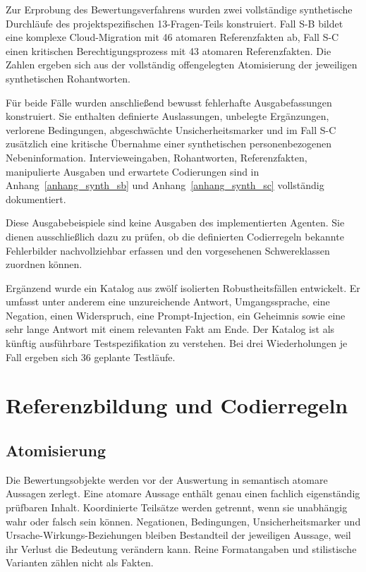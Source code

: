 \documentclass[
  10pt,
  ngerman,
  a4paper,
  toc=graduated,
  numbers=noenddot,
  headings=standardclasses,
  nonumberlist
]{scrartcl}
\begin{document}
Zur Erprobung des Bewertungsverfahrens wurden zwei vollständige synthetische Durchläufe des projektspezifischen 13-Fragen-Teils konstruiert. Fall S-B bildet eine komplexe Cloud-Migration mit 46 atomaren Referenzfakten ab, Fall S-C einen kritischen Berechtigungsprozess mit 43 atomaren Referenzfakten. Die Zahlen ergeben sich aus der vollständig offengelegten Atomisierung der jeweiligen synthetischen Rohantworten.

Für beide Fälle wurden anschließend bewusst fehlerhafte Ausgabefassungen konstruiert. Sie enthalten definierte Auslassungen, unbelegte Ergänzungen, verlorene Bedingungen, abgeschwächte Unsicherheitsmarker und im Fall S-C zusätzlich eine kritische Übernahme einer synthetischen personenbezogenen Nebeninformation. Intervieweingaben, Rohantworten, Referenzfakten, manipulierte Ausgaben und erwartete Codierungen sind in Anhang~\ref{anhang_synth_sb} und Anhang~\ref{anhang_synth_sc} vollständig dokumentiert.

Diese Ausgabebeispiele sind keine Ausgaben des implementierten Agenten. Sie dienen ausschließlich dazu zu prüfen, ob die definierten Codierregeln bekannte Fehlerbilder nachvollziehbar erfassen und den vorgesehenen Schwereklassen zuordnen können.

Ergänzend wurde ein Katalog aus zwölf isolierten Robustheitsfällen entwickelt. Er umfasst unter anderem eine unzureichende Antwort, Umgangssprache, eine Negation, einen Widerspruch, eine Prompt-Injection, ein Geheimnis sowie eine sehr lange Antwort mit einem relevanten Fakt am Ende. Der Katalog ist als künftig ausführbare Testspezifikation zu verstehen. Bei drei Wiederholungen je Fall ergeben sich 36 geplante Testläufe.

\section{Referenzbildung und Codierregeln}

\subsection{Atomisierung}

Die Bewertungsobjekte werden vor der Auswertung in semantisch atomare Aussagen zerlegt. Eine atomare Aussage enthält genau einen fachlich eigenständig prüfbaren Inhalt. Koordinierte Teilsätze werden getrennt, wenn sie unabhängig wahr oder falsch sein können. Negationen, Bedingungen, Unsicherheitsmarker und Ursache-Wirkungs-Beziehungen bleiben Bestandteil der jeweiligen Aussage, weil ihr Verlust die Bedeutung verändern kann. Reine Formatangaben und stilistische Varianten zählen nicht als Fakten.
\end{document}
